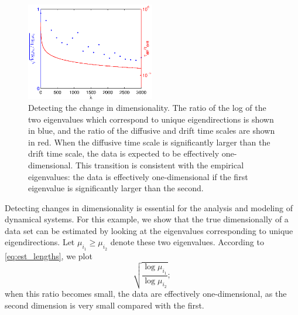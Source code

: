 \documentclass[preprint]{elsarticle}
\begin{document}
\begin{figure}[t]
%
\centering
\includegraphics[width=0.5\textwidth]{chemotaxis_compare_timescales_evals}
%
\caption{Detecting the change in dimensionality. The ratio of the log of the two eigenvalues which correspond to unique eigendirections is shown in blue, and the ratio of the diffusive and drift time scales are shown in red. When the diffusive time scale is significantly larger than the drift time scale, the data is expected to be effectively one-dimensional. This transition is consistent with the empirical eigenvalues: the data is effectively one-dimensional if the first eigenvalue is significantly larger than the second. }
%
\label{fig:chemotaxis_compare_timescales_evals}
%
\end{figure}

Detecting changes in dimensionality is essential for the analysis and modeling of dynamical systems. 
%
For this example, we show that the true dimensionally of a data set can be estimated by looking at the eigenvalues corresponding to unique eigendirections. 
%
%
%
Let $\mu_{i_1} \ge \mu_{i_2}$ denote these two eigenvalues. 
%
According to \eqref{eq:est_lengths}, we plot  
\begin{equation}\label{eq:chemotaxis_eval_ratio}
 \sqrt{\frac{\log \mu_{i_1}}{\log \mu_{i_2}}} ;
\end{equation}
when this ratio becomes small, the data are effectively one-dimensional, as the second dimension is very small compared with the first. 
%
\end{document}
